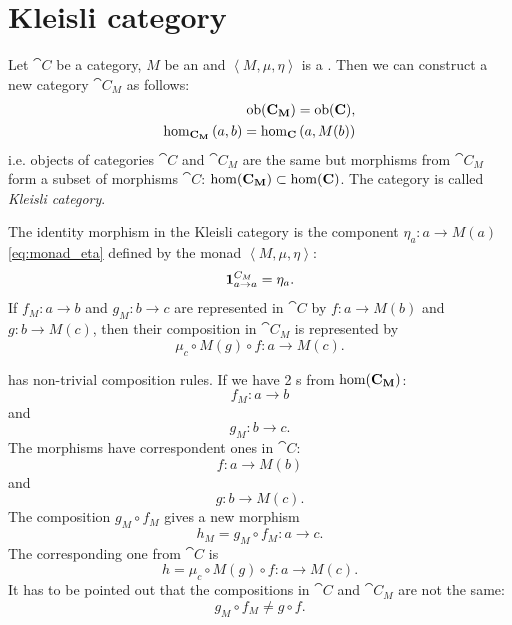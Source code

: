 \chapter{Kleisli category}

\begin{definition}
\label{def:kleisli_category}
Let $\cat{C}$ be a category, $M$ be an  and
$\left<M, \mu, \eta\right>$ is a . Then we can
construct a new category $\cat{C_M}$ as follows:
\begin{eqnarray}
\catob{C_M} = \catob{C},
\nonumber \\
\catmset[C_M]{a}{b} =
\catmset[C]{a}{M(b)} 
\nonumber
\end{eqnarray}
i.e. objects of categories $\cat{C}$ and $\cat{C_M}$ are the same but
morphisms from $\cat{C_M}$ form a subset of morphisms $\cat{C}$:
$\mathrm{hom}(\mathbf{C_M}) \subset \mathrm{hom}(\mathbf{C})$. The category is called
\textit{Kleisli category}. 

The identity morphism in the Kleisli category is the
 component $\eta_a: a \to M(a)$
\eqref{eq:monad_eta} defined by the monad $\left<M, \mu, \eta\right>$:
\[
\mathbf{1}_{ a \to a }^{C_M} = \eta_a.
\]
If $f_M: a \to b$ and $g_M: b \to c$ are represented in $\cat{C}$ by
$f: a \to M(b)$ and $g: b \to M(c)$, then their composition in
$\cat{C_M}$ is represented by
\[
\mu_c \circ M(g) \circ f: a \to M(c).
\]
\end{definition}

\begin{remark}
 has non-trivial composition rules.
If we have 2 s from $\mathrm{hom}(\mathbf{C_M})$:
\[
f_M: a \to b
\]
and
\[
g_M: b \to c.
\]
The morphisms have correspondent ones in $\cat{C}$:
\[
f: a \to M(b)
\]
and
\[
g: b \to M(c).
\]
The composition $g_M \circ f_M$ gives a new morphism
\[
h_M = g_M \circ f_M: a \to c.
\]
The corresponding one from $\cat{C}$ is
\[
h = \mu_c \circ M(g) \circ f: a \to M(c).
\]
It has to be pointed out that the compositions in $\cat{C}$ and
$\cat{C_M}$ are not the same:
\[
g_M \circ f_M \ne g \circ f.
\]
\end{remark}

